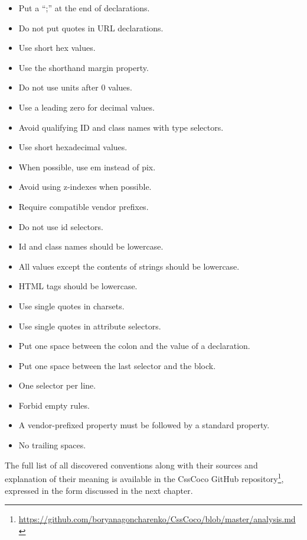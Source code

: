 \begin{itemize} 
\item Put a ``;'' at the end of declarations. 
\item Do not put quotes in URL declarations.
\item Use short hex values.
\item Use the shorthand margin property.
\item Do not use units after 0 values.
\item Use a leading zero for decimal values.
\item Avoid qualifying ID and class names with type selectors. 
\item Use short hexadecimal values. 
\item When possible, use em instead of pix. 
\item Avoid using z-indexes when possible. 
\item Require compatible vendor prefixes. 
\item Do not use id selectors. 
\item Id and class names should be lowercase.
\item All values except the contents of strings should be lowercase.  
\item HTML tags should be lowercase.
\item Use single quotes in charsets.
\item Use single quotes in attribute selectors.
\item Put one space between the colon and the value of a declaration.
\item Put one space between the last selector and the block.
\item One selector per line.
\item Forbid empty rules.
\item A vendor-prefixed property must be followed by a standard property.
\item No trailing spaces.
\end{itemize}

The full list of all discovered conventions along with their sources and
explanation of their meaning is available in the CssCoco GitHub repository\footnote{\url{https://github.com/boryanagoncharenko/CssCoco/blob/master/analysis.md}}, expressed in the form discussed in the next chapter.

